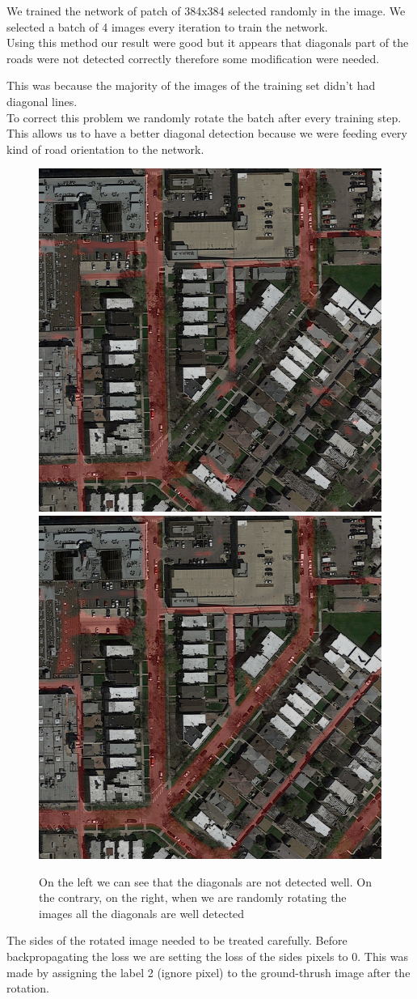 \documentclass[10pt,conference,compsocconf]{IEEEtran}
\begin{document}
We trained the network of patch of 384x384 selected randomly in the image. We selected a batch of 4 images every iteration to train the network.\\

Using this method our result were good but it appears that diagonals part of the roads were not detected correctly therefore some modification were needed.

This was because the majority of the images of the training set didn’t had diagonal lines.\\

To correct this problem we randomly rotate the batch after every training step. This allows us to have a better diagonal detection because we were feeding every kind of road orientation to the network.

\begin{figure}[h]
 \centering
 \includegraphics[width=0.35\columnwidth]{img/diagonals.png}
 \includegraphics[width=0.35\columnwidth]{img/diagonals_corrected.png}
 \caption{On the left we can see that the diagonals are not detected well. On the contrary, on the right, when we are randomly rotating the images all the diagonals are well detected}
 \vspace{-3mm}
 \label{fig:diagonal}
\end{figure}

The sides of the rotated image needed to be treated carefully. Before backpropagating the loss we are setting the loss of the sides pixels to 0. This was made by assigning the label 2 (ignore pixel) to the ground-thrush image after the rotation.\\
\end{document}
